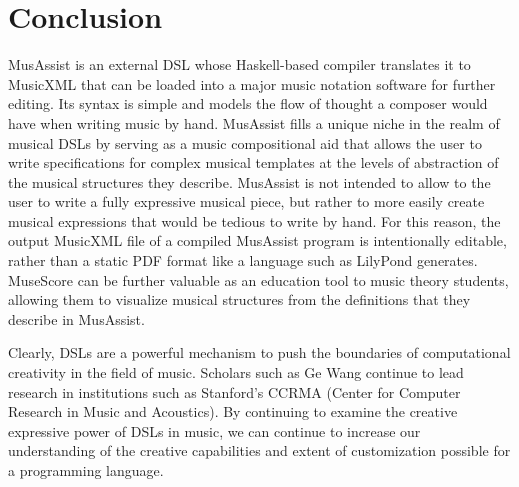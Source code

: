 \documentclass{report}
\begin{document}
\section{Conclusion}
MusAssist is an external DSL whose Haskell-based compiler translates it to MusicXML that can be loaded into a major music notation software for further editing. Its syntax is simple and models the flow of thought a composer would have when writing music by hand. MusAssist fills a unique niche in the realm of musical DSLs by serving as a music compositional aid that allows the user to write specifications for complex musical templates at the levels of abstraction of the musical structures they describe. MusAssist is not intended to allow to the user to write a fully expressive musical piece, but rather to more easily create musical expressions that would be tedious to write by hand. For this reason, the output MusicXML file of a compiled MusAssist program is intentionally editable, rather than a static PDF format like a language such as LilyPond generates. MuseScore can be further valuable as an education tool to music theory students, allowing them to visualize musical structures from the definitions that they describe in MusAssist.

Clearly, DSLs are a powerful mechanism to push the boundaries of  computational creativity in the field of music. Scholars such as  Ge Wang continue to lead  research in institutions such as Stanford's CCRMA (Center for Computer Research in Music and Acoustics). By continuing to examine the creative expressive power of DSLs  in  music, we can continue to increase our understanding of the creative capabilities and extent of customization possible for  a programming language.



\end{document}
